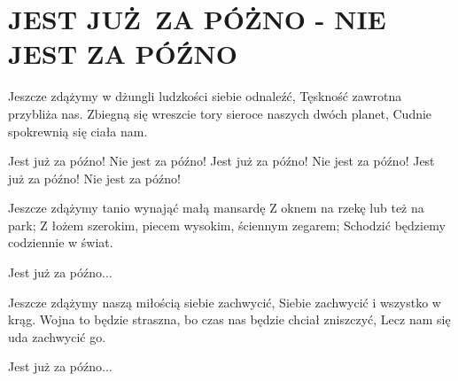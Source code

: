 \documentclass[../../../songbook.tex]{subfiles}
\begin{document}
\TabPositions{9cm} %
\section*{JEST JUŻ ZA PÓŻNO - NIE JEST ZA PÓŹNO}
{}
\vspace{0.5cm}
Jeszcze zdążymy w dżungli ludzkości siebie odnaleźć, 	 \newline
Tęskność zawrotna przybliża nas. 						 \newline
Zbiegną się wreszcie tory sieroce naszych dwóch planet, \newline
Cudnie spokrewnią się ciała nam. \newline

\-\hspace{1cm} Jest już za późno!  \newline
\-\hspace{1cm} Nie jest za późno!  \newline
\-\hspace{1cm} Jest już za późno!  \newline
\-\hspace{1cm} Nie jest za późno!  \newline
\-\hspace{1cm} Jest już za późno!  \newline
\-\hspace{1cm} Nie jest za późno!  \newline

Jeszcze zdążymy tanio wynająć małą mansardę \newline
Z oknem na rzekę lub też na park; \newline
Z łożem szerokim, piecem wysokim, ściennym zegarem; \newline
Schodzić będziemy codziennie w świat. \newline

\-\hspace{1cm} Jest już za późno... \newline

Jeszcze zdążymy naszą miłością siebie zachwycić, \newline
Siebie zachwycić i wszystko w krąg. \newline
Wojna to będzie straszna, bo czas nas będzie chciał zniszczyć, \newline
Lecz nam się uda zachwycić go. \newline

\-\hspace{1cm} Jest już za późno... \newline
\end{document}
